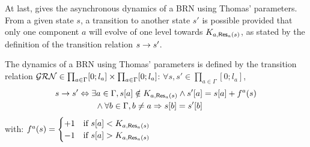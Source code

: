 
At last,  gives the asynchronous dynamics of a BRN using Thomas' parameters.
From a given state $s$, a transition to another state $s'$ is possible provided that only one component $a$ will evolve of one level towards $K_{a,\mathsf{Res}_{a}(s)}$,
as stated by the definition of the transition relation $s \rightarrow s'$.

\begin{definition}\label{def:dynamics}
The dynamics of a BRN using Thomas' parameters is defined by the transition relation $\mathcal{GRN}{}{} \in \prod_{a \in \Gamma} [0;l_a] \times \prod_{a \in \Gamma} [0;l_a]$:
$\forall s, s' \in \prod_{a \in \Gamma} [0;l_a]$,
\begin{align*}
s \rightarrow s' &\Leftrightarrow \exists a \in \Gamma, {s[a]} \notin K_{a, \mathsf{Res}_{a}(s)} \wedge {s'[a]} = {s[a]} + f^a(s) \\
  & \qquad \wedge \forall b \in \Gamma, b \neq a \Rightarrow {s[b]} = {s'[b]}
\end{align*}
with: $f^a(s) = 
  \begin{cases}
    +1 & \text{if } {s[a]} < K_{a, \mathsf{Res}_{a}(s)} \\
    -1 & \text{if } {s[a]} > K_{a, \mathsf{Res}_{a}(s)} \\
  \end{cases}$
\begin{comment}
Let $s$ be a state of a BRN using Thomas' parameters $(\IG, K)$ where $\IG = (\Gamma, E_+, E_-)$.
The state that succeeds to $s$ is given by the indeterministic function $f(s)$:
\begin{align*}
  f(s)  & = s' \Leftrightarrow \exists a \in \Gamma,
    \GRNget{s'}{a} = f^a(s) \wedge
    \forall b \in \Gamma, b \neq a, \GRNget{s}{b} = \GRNget{s'}{b}
    \quad\text{, with}\\
  f^a(s) & =
  \begin{cases}
    \GRNget{s}{a} + 1 & \text{if } \GRNget{s}{a} < K_{a,A,B} \\%
    \GRNget{s}{a} & \text{if } \GRNget{s}{a} \in K_{a,A,B} \\ %
    \GRNget{s}{a} - 1 & \text{if } \GRNget{s}{a} > K_{a,A,B} %
  \end{cases}
\quad\text{, where $A,B=\GRNres{a}{s}$.}
\end{align*}
\end{comment}
\end{definition}

